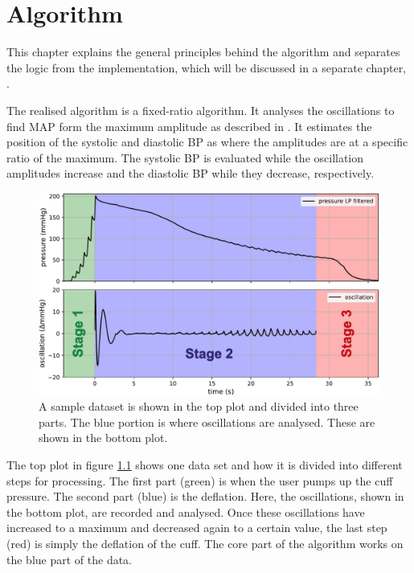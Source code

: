 \chapter{Algorithm}\label{cp:algo}

This chapter explains the general principles behind the algorithm and separates the logic from the implementation, which will be discussed in a separate chapter, . 

The realised algorithm is a fixed-ratio algorithm. It analyses the oscillations to find MAP form the maximum amplitude as described in . It estimates the position of the systolic and diastolic BP as where the amplitudes are at a specific ratio of the maximum. The systolic BP is evaluated while the oscillation amplitudes increase and the diastolic BP while they decrease, respectively.


\begin{figure}[ht]
\centering
\includegraphics[width=\textwidth]{figures/algo_overview.pdf}
\caption{A sample dataset is shown in the top plot and divided into three parts. The blue portion is where oscillations are analysed. These are shown in the bottom plot.}
\label{fig:algoOverview}
\end{figure}

The top plot in figure \ref{fig:algoOverview} shows one data set and how it is divided into different steps for processing. The first part (green) is when the user pumps up the cuff pressure. The second part (blue) is the deflation. Here, the oscillations, shown in the bottom plot, are recorded and analysed. Once these oscillations have increased to a maximum and decreased again to a certain value, the last step (red) is simply the deflation of the cuff. The core part of the algorithm works on the blue part of the data.



